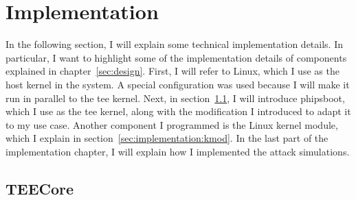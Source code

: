 \chapter{Implementation}
\label{sec:implementation}


In the following section, I will explain some technical implementation details.
In particular, I want to highlight some of the implementation details of
components explained in chapter~\ref{sec:design}. First, I will refer to Linux,
which I use as the host kernel in the system. A special configuration was used
because I will make it run in parallel to the \gls{tee} kernel. Next, in
section~\ref{sec:implementation:teeKernel}, I will introduce phipsboot, which I
use as the \gls{tee} kernel, along with the modification I introduced to adapt
it to my use case. Another component I programmed is the Linux kernel module,
which I explain in section~\ref{sec:implementation:kmod}. In the last part of
the implementation chapter, I will explain how I implemented the attack
simulations.
\section{TEECore}
\label{sec:implementation:teeKernel}

